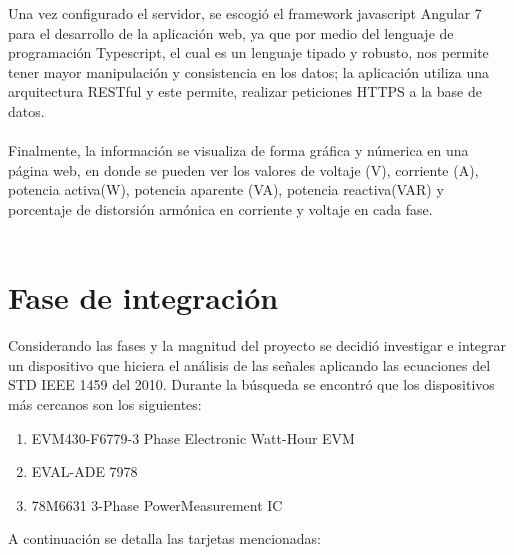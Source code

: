 Una vez configurado el servidor, se escogió el framework javascript Angular 7 para el desarrollo de la aplicación web, ya que por medio del lenguaje de programación Typescript, el cual es un lenguaje tipado y robusto, nos permite tener mayor manipulación y consistencia en los datos; la aplicación utiliza una arquitectura RESTful y este permite, realizar peticiones HTTPS a la base de datos.\\\\
Finalmente, la información se visualiza de forma gráfica y númerica en una página web, en donde se pueden ver los valores de voltaje (V), corriente (A), potencia activa(W), potencia aparente (VA), potencia reactiva(VAR) y porcentaje de distorsión armónica en corriente y voltaje en cada fase.\\\\


\section{Fase de integración}
Considerando las fases y la magnitud del proyecto se decidió investigar e integrar un dispositivo que hiciera el análisis de las señales aplicando las ecuaciones del STD IEEE 1459 del 2010. Durante la búsqueda se encontró que los dispositivos más cercanos son los siguientes:\\
\begin{enumerate}
    \itemsep0em
    \item EVM430-F6779-3 Phase Electronic Watt-Hour EVM
    \item EVAL-ADE 7978
    \item 78M6631 3-Phase PowerMeasurement IC
\end{enumerate}

A continuación se detalla las tarjetas mencionadas:\\
